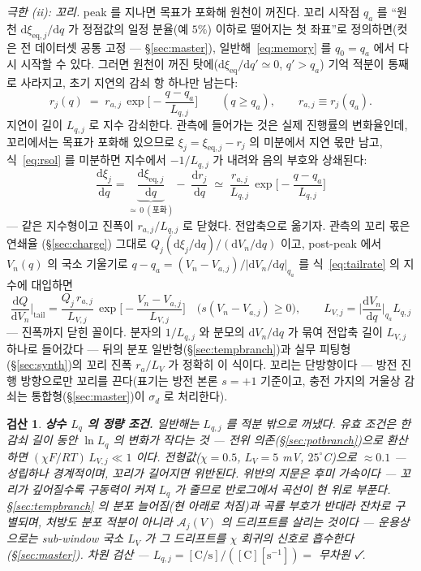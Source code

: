 \documentclass[11pt,a4paper]{article}
\newtheorem*{verifybox}{검산}
\newcommand{\dd}{\mathrm{d}}
\newcommand{\eq}{\mathrm{eq}}
\begin{document}
\emph{극한 (ii): 꼬리.} peak 를 지나면 목표가 포화해 원천이 꺼진다. 꼬리 시작점 $q_a$ 를 ``원천
$\dd\xi_{\eq,j}/\dd q$ 가 정점값의 일정 분율(예 $5\%$) 이하로 떨어지는 첫 좌표''로 정의하면(컷은 전
데이터셋 공통 고정 — \S\ref{sec:master}), 일반해~\eqref{eq:memory} 를 $q_0=q_a$ 에서 다시
시작할 수 있다. 그러면 원천이 꺼진 탓에($\dd\xi_{\eq}/\dd q'\simeq0$, $q'>q_a$) 기억 적분이
통째로 사라지고, 초기 지연의 감쇠 항 하나만 남는다:
\begin{equation}
r_j(q)\;=\;r_{a,j}\,\exp\!\Big[-\frac{q-q_a}{L_{q,j}}\Big]\qquad(q\ge q_a),\qquad
r_{a,j}\equiv r_j(q_a).
\label{eq:rsol}
\end{equation}
지연이 길이 $L_{q,j}$ 로 지수 감쇠한다. 관측에 들어가는 것은 실제 진행률의 변화율인데, 꼬리에서는
목표가 포화해 있으므로 $\xi_j=\xi_{\eq,j}-r_j$ 의 미분에서 지연 몫만 남고, 식~\eqref{eq:rsol} 를
미분하면 지수에서 $-1/L_{q,j}$ 가 내려와 음의 부호와 상쇄된다:
\begin{equation}
\frac{\dd\xi_j}{\dd q}
=\underbrace{\frac{\dd\xi_{\eq,j}}{\dd q}}_{\simeq\,0\ (\text{포화})}-\;\frac{\dd r_j}{\dd q}
\;\simeq\;\frac{r_{a,j}}{L_{q,j}}\,\exp\!\Big[-\frac{q-q_a}{L_{q,j}}\Big]
\label{eq:tailrate}
\end{equation}
— 같은 지수형이고 진폭이 $r_{a,j}/L_{q,j}$ 로 닫혔다. 전압축으로 옮기자. 관측의 꼬리 몫은 연쇄율
(\S\ref{sec:charge}) 그대로 $Q_j(\dd\xi_j/\dd q)/(\dd V_n/\dd q)$ 이고, post-peak 에서
$V_n(q)$ 의 국소 기울기로 $q-q_a=(V_n-V_{a,j})/|\dd V_n/\dd q|_{q_a}$ 를 식~\eqref{eq:tailrate}
의 지수에 대입하면
\begin{equation}
\frac{\dd Q}{\dd V_n}\Big|_{\text{tail}}
=\frac{Q_j\,r_{a,j}}{L_{V,j}}\,
\exp\!\Big[-\frac{V_n-V_{a,j}}{L_{V,j}}\Big]\quad\big(s(V_n-V_{a,j})\ge0\big),\qquad
L_{V,j}=\Big|\frac{\dd V_n}{\dd q}\Big|_{q_a}L_{q,j}
\label{eq:tail}
\end{equation}
— 진폭까지 닫힌 꼴이다. 분자의 $1/L_{q,j}$ 와 분모의 $\dd V_n/\dd q$ 가 묶여 전압축 길이
$L_{V,j}$ 하나로 들어갔다 — 뒤의 분포 일반형(\S\ref{sec:tempbranch})과 실무 피팅형
(\S\ref{sec:synth})의 꼬리 진폭 $r_a/L_V$ 가 정확히 이 식이다.
꼬리는 단방향이다 — 방전 진행 방향으로만 꼬리를 끈다(표기는 방전 본론 $s=+1$ 기준이고, 충전
가지의 거울상 감쇠는 통합형(\S\ref{sec:master})이 $\sigma_d$ 로 처리한다).

\begin{verifybox}
\textbf{상수 $L_q$ 의 정량 조건.} 일반해는 $L_{q,j}$ 를 적분 밖으로 꺼냈다. 유효 조건은 한 감쇠 길이
동안 $\ln L_q$ 의 변화가 작다는 것 — 전위 의존(\S\ref{sec:potbranch})으로 환산하면
$(\chi F/RT)\,L_{V,j}\ll1$ 이다. 전형값($\chi=0.5$, $L_V=5$ mV, $25^\circ$C)으로 $\approx0.1$ —
성립하나 경계적이며, 꼬리가 길어지면 위반된다. 위반의 지문은 후미 \emph{가속}이다 — 꼬리가 깊어질수록
구동력이 커져 $L_q$ 가 줄므로 반로그에서 곡선이 현 \emph{위로} 부푼다. \S\ref{sec:tempbranch} 의 분포
늘어짐(현 \emph{아래로} 처짐)과 곡률 부호가 반대라 잔차로 구별되며, 처방도 분포 적분이 아니라
$\mathcal A_j(V)$ 의 드리프트를 살리는 것이다 — 운용상으로는 sub-window 국소 $L_V$ 가 그 드리프트를 $\chi$ 회귀의
신호로 흡수한다(\S\ref{sec:master}).
차원 검산 — $L_{q,j}=[\mathrm{C/s}]/([\mathrm C][\mathrm{s^{-1}}])=$ 무차원 ✓.
\end{verifybox}
\end{document}
